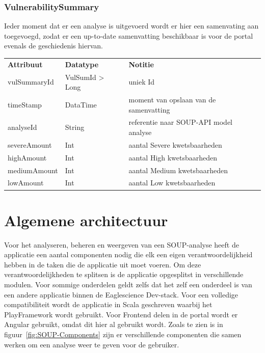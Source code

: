 \subsubsection{VulnerabilitySummary}\label{subsubsec:portalVulSum}
Ieder moment dat er een analyse is uitgevoerd wordt er hier een samenvating aan toegevoegd, zodat er een up-to-date samenvatting beschikbaar is voor de portal evenals de geschiedenis hiervan.

\begin{tabular}{lll}
    \textbf{Attribuut} & \textbf{Datatype} & \textbf{Notitie}                       \\
    vulSummaryId       & VulSumId > Long   & uniek Id                               \\
    timeStamp          & DataTime          & moment van opslaan van de samenvatting \\
    analyseId          & String            & referentie naar SOUP-API model analyse \\
    severeAmount       & Int               & aantal Severe kwetsbaarheden           \\
    highAmount         & Int               & aantal High kwetsbaarheden             \\
    mediumAmount       & Int               & aantal Medium kwetsbaarheden           \\
    lowAmount          & Int               & aantal Low kwetsbaarheden              \\
\end{tabular}


\section{Algemene architectuur}\label{sec:algemene-architectuur}
Voor het analyseren, beheren en weergeven van een SOUP-analyse heeft de applicatie een aantal componenten nodig die elk een eigen verantwoordelijkheid hebben in de taken die de applicatie uit moet voeren. Om deze verantwoordelijkheden te splitsen is de applicatie opgesplitst in verschillende modulen. Voor sommige onderdelen geldt zelfs dat het zelf een onderdeel is van een andere applicatie binnen de Eaglescience Dev-stack. Voor een volledige compatibiliteit wordt de applicatie in Scala geschreven waarbij het PlayFramework wordt gebruikt. Voor Frontend delen in de portal wordt er Angular gebruikt, omdat dit hier al gebruikt wordt. Zoals te zien is in figuur~\ref{fig:SOUP-Components} zijn er verschillende componenten die samen werken om een analyse weer te geven voor de gebruiker.

